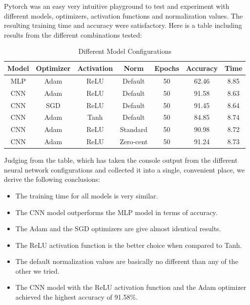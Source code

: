 Pytorch was an easy very intuitive playground to test and experiment with different models, 
optimizers, activation functions and normalization values. The resulting training time and 
accuracy were satisfactory. Here is a table including results from the different combinations
tested:
\begin{table}[H]
    \centering
    \begin{tabular}{|c|c|c|c|c|c|c|}
        \hline
        \textbf{Model} & \textbf{Optimizer} & \textbf{Activation} & \textbf{Norm} & 
        \textbf{Epochs} & \textbf{Accuracy} & \textbf{Time} \\
        \hline
        MLP & Adam & ReLU & Default & 50 & 62.46 & 8.85 \\
        CNN & Adam & ReLU & Default & 50 & 91.58 & 8.63 \\
        CNN & SGD & ReLU & Default & 50 & 91.45 & 8.64 \\
        CNN & Adam & Tanh & Default & 50 & 84.85 & 8.74 \\
        CNN & Adam & ReLU & Standard & 50 & 90.98 & 8.72 \\
        CNN & Adam & ReLU & Zero-cent & 50 & 91.24 & 8.73 \\
        \hline
    \end{tabular}
    \vspace{0.5cm}
    \caption{Different Model Configurations}
\end{table}

Judging from the table, which has taken the console output from the different neural network
configurations and collected it into a single, convenient place, we derive the following 
conclusions:
\begin{itemize}
    \item The training time for all models is very similar.
    \item The CNN model outperforms the MLP model in terms of accuracy.
    \item The Adam and the SGD optimizers are give almost identical results.
    \item The ReLU activation function is the better choice when compared to Tanh.
    \item The default normalization values are basically no different than any of
    the other we tried.
    \item The CNN model with the ReLU activation function and the Adam optimizer
    achieved the highest accuracy of 91.58\%.
\end{itemize}

